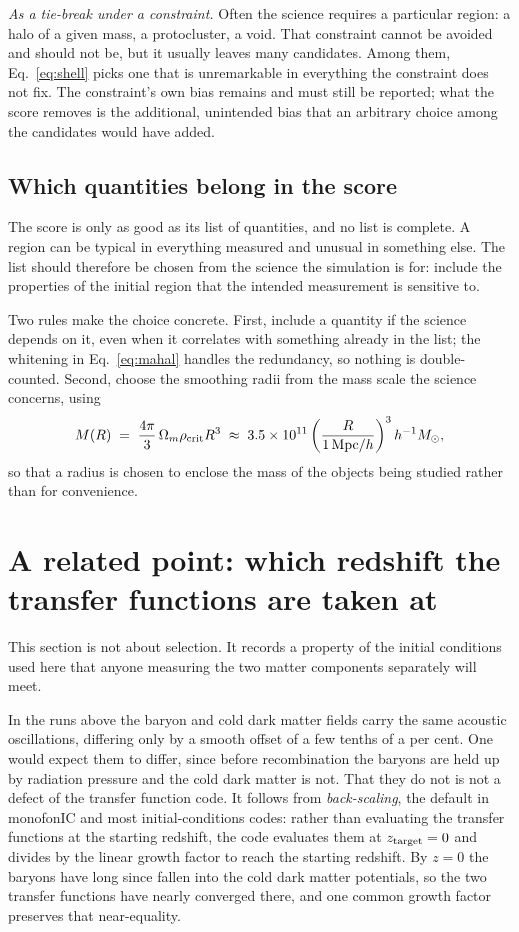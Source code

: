 \documentclass[12pt]{article}
\begin{document}
\emph{As a tie-break under a constraint.} Often the science requires a
particular region: a halo of a given mass, a protocluster, a void. That
constraint cannot be avoided and should not be, but it usually leaves many
candidates. Among them, Eq.~\eqref{eq:shell} picks one that is unremarkable in
everything the constraint does not fix. The constraint's own bias remains and
must still be reported; what the score removes is the additional, unintended
bias that an arbitrary choice among the candidates would have added.

\subsection{Which quantities belong in the score}
\label{sec:which-Q}

The score is only as good as its list of quantities, and no list is complete. A
region can be typical in everything measured and unusual in something else. The
list should therefore be chosen from the science the simulation is for: include
the properties of the initial region that the intended measurement is sensitive
to.

Two rules make the choice concrete. First, include a quantity if the science
depends on it, even when it correlates with something already in the list; the
whitening in Eq.~\eqref{eq:mahal} handles the redundancy, so nothing is
double-counted. Second, choose the smoothing radii from the mass scale the
science concerns, using
\begin{equation}
  \label{eq:mass}
  M(R) \;=\; \frac{4\pi}{3}\,\Omega_m \rho_{\rm crit} R^3
  \;\approx\; 3.5\times10^{11}
  \left(\frac{R}{1\,\mathrm{Mpc}/h}\right)^3 h^{-1} M_\odot ,
\end{equation}
so that a radius is chosen to enclose the mass of the objects being studied
rather than for convenience.

\section{A related point: which redshift the transfer functions are taken at}
\label{sec:ztarget}

This section is not about selection. It records a property of the initial
conditions used here that anyone measuring the two matter components separately
will meet.

In the runs above the baryon and cold dark matter fields carry the same acoustic
oscillations, differing only by a smooth offset of a few tenths of a per cent.
One would expect them to differ, since before recombination the baryons are held
up by radiation pressure and the cold dark matter is not. That they do not is
not a defect of the transfer function code. It follows from \emph{back-scaling},
the default in monofonIC and most initial-conditions codes: rather than
evaluating the transfer functions at the starting redshift, the code evaluates
them at $z_{\rm target} = 0$ and divides by the linear growth factor to reach
the starting redshift. By $z = 0$ the baryons have long since fallen into the
cold dark matter potentials, so the two transfer functions have nearly converged
there, and one common growth factor preserves that near-equality.
\end{document}
